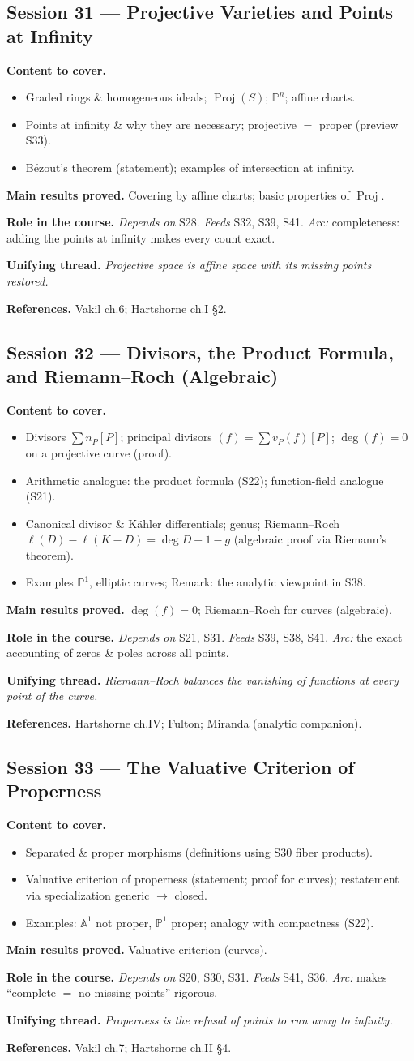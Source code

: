 \documentclass[11pt,a4paper]{article}
\newcommand{\sess}[2]{\subsection[#1. #2]{Session #1 --- #2}}
\newcommand{\chead}{\par\smallskip\noindent\textbf{Content to cover.}}
\newcommand{\proved}[1]{\par\smallskip\noindent\textbf{Main results proved.} #1}
\newcommand{\role}[1]{\par\smallskip\noindent\textbf{Role in the course.} #1}
\newcommand{\thread}[1]{\par\smallskip\noindent\textbf{Unifying thread.} \textit{#1}}
\newcommand{\srefs}[1]{\par\smallskip\noindent\textbf{References.} #1}
\newcommand{\PP}{\mathbb{P}}
\newcommand{\Proj}{\operatorname{Proj}}
\begin{document}
	\sess{31}{Projective Varieties and Points at Infinity}
	\chead
	\begin{itemize}
		\item Graded rings \& homogeneous ideals; $\Proj(S)$; $\PP^n$; affine charts.
		\item Points at infinity \& why they are necessary; projective $=$ proper (preview S33).
		\item B\'ezout's theorem (statement); examples of intersection at infinity.
	\end{itemize}
	\proved{Covering by affine charts; basic properties of $\Proj$.}
	\role{\emph{Depends on} S28. \emph{Feeds} S32, S39, S41. \emph{Arc:} completeness: adding the points at infinity makes every count exact.}
	\thread{Projective space is affine space with its missing points restored.}
	\srefs{Vakil ch.6; Hartshorne ch.I \S2.}
	
	\sess{32}{Divisors, the Product Formula, and Riemann--Roch (Algebraic)}
	\chead
	\begin{itemize}
		\item Divisors $\sum n_P[P]$; principal divisors $(f)=\sum v_P(f)[P]$; $\deg(f)=0$ on a projective curve (proof).
		\item Arithmetic analogue: the product formula (S22); function-field analogue (S21).
		\item Canonical divisor \& K\"ahler differentials; genus; Riemann--Roch $\ell(D)-\ell(K-D)=\deg D+1-g$ (algebraic proof via Riemann's theorem).
		\item Examples $\PP^1$, elliptic curves; Remark: the analytic viewpoint in S38.
	\end{itemize}
	\proved{$\deg(f)=0$; Riemann--Roch for curves (algebraic).}
	\role{\emph{Depends on} S21, S31. \emph{Feeds} S39, S38, S41. \emph{Arc:} the exact accounting of zeros \& poles across all points.}
	\thread{Riemann--Roch balances the vanishing of functions at every point of the curve.}
	\srefs{Hartshorne ch.IV; Fulton; Miranda (analytic companion).}
	
	\sess{33}{The Valuative Criterion of Properness}
	\chead
	\begin{itemize}
		\item Separated \& proper morphisms (definitions using S30 fiber products).
		\item Valuative criterion of properness (statement; proof for curves); restatement via specialization generic $\to$ closed.
		\item Examples: $\mathbb A^1$ not proper, $\PP^1$ proper; analogy with compactness (S22).
	\end{itemize}
	\proved{Valuative criterion (curves).}
	\role{\emph{Depends on} S20, S30, S31. \emph{Feeds} S41, S36. \emph{Arc:} makes ``complete $=$ no missing points'' rigorous.}
	\thread{Properness is the refusal of points to run away to infinity.}
	\srefs{Vakil ch.7; Hartshorne ch.II \S4.}
	
\end{document}

